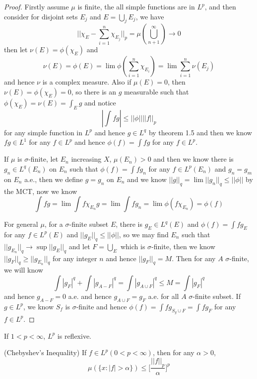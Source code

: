 \begin{proof}\par
    Firstly assume $\mu$ is finite, the all simple functions are in $L^p$, and then consider for disjoint sets $E_j$ and $E = \bigcup_j E_j$, we have
    \[
    ||\chi_E - \sum\limits_{i=1}^n\chi_{E_j}||_p = \mu(\bigcup_{n+1}^{\infty}) \to 0
    \]
    then let $\nu(E) = \phi(\chi_E)$ and
    \[\nu(E) = \phi(E) = \lim \phi(\sum\limits_{i=1}^n \chi_{E_i}) = \lim \sum\limits_{i=1}^n \nu(E_j)\]
    and hence $\nu$ is a complex measure. Also if $\mu(E) = 0$, then $\nu(E) = \phi(\chi_E) = 0$, so there is an $g$ measurable such that $\phi(\chi_E) = \nu(E) = \int_E g$ and notice
    \[
    |\int fg| \leq ||\phi||||f||_p
    \]
    for any simple function in $L^p$ and hence $g\in L^q$ by theorem 1.5 and then we know $fg \in L^1$ for any $f\in L^p$ and hence $\phi(f) = \int fg$ for any $f\in L^p$.\par
    If $\mu$ is $\sigma$-finite, let $E_n$ increasing $X$, $\mu(E_n) > 0$ and then we know there is $g_n \in L^q(E_n)$ on $E_n$ such that $\phi(f) = \int fg_n$ for any $f\in L^p(E_n)$ and $g_n = g_m$ on $E_n$ a.e., then we define $g= g_n$ on $E_n$ and we know $||g||_q = \lim ||g_n||_q \leq ||\phi||$ by the MCT, now we know
    \[
    \int fg = \lim \int f\chi_{E_n}g = \lim \int fg_n = \lim \phi(f\chi_{E_n}) = \phi(f)
    \]\par
    For general $\mu$, for a $\sigma$-finite subset $E$, there is $g_E\in L^q(E)$ and $\phi(f) = \int fg_E$ for any $f\in L^p(E)$ and $||g_E||_q \leq ||\phi||$, so we may find $E_n$ such that $||g_{E_n}||_q \to \sup||g_E||_q$ and let $F = \bigcup_E$ which is $\sigma$-finite, then we know $||g_F||_q \geq ||g_{E_n}||_q$ for any integer $n$ and hence $||g_F||_q = M$. Then for any $A$ $\sigma$-finite, we will know
    \[
    \int |g_F|^q + \int |g_{A-F}|^q = \int |g_{A\cup F}|^q \leq M = \int |g_F|^q
    \]
    and hence $g_{A-F} = 0$ a.e. and hence $g_{A\cup F} = g_F$ a.e. for all $A$ $\sigma$-finite subset. If $g\in L^p$, we know $S_f$ is $\sigma$-finite and hence $\phi(f) = \int fg_{S_g\cup F} = \int f g_F$ for any $f\in L^p$.
\end{proof}

\begin{corollary}
    If $1 < p < \infty$, $L^p$ is reflexive.
\end{corollary}

\begin{theorem}
    (Chebyshev's Inequality) If $f\in L^p(0<p<\infty)$, then for any $\alpha > 0$,
    \[\mu(\{x:|f|>\alpha\}) \leq \Big[\dfrac{||f||_p}{\alpha}\Big]^p\]
\end{theorem}

